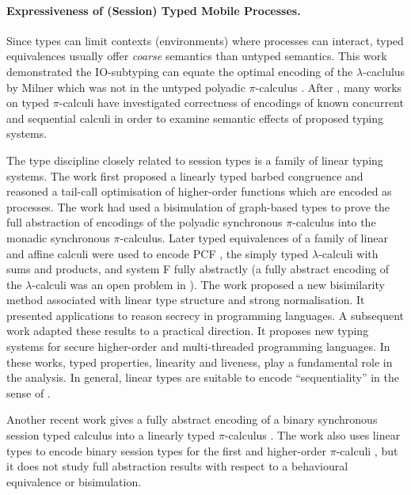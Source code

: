 \paragraph{Expressiveness of (Session) Typed Mobile Processes.}
Since types can limit
contexts (environments) where processes can interact, typed equivalences
usually offer {\em coarse} semantics than untyped semantics. 
This work demonstrated the IO-subtyping can equate 
the optimal encoding of the $\lambda$-caclulus by Milner which was not 
in the untyped polyadic $\pi$-calculus \cite{MilnerR:funp}. 
After \cite{PiSa96b}, many works on typed $\pi$-calculi 
have investigated correctness of encodings of known concurrent and
sequential calculi in order to examine semantic
effects of proposed typing systems. 

The type discipline closely related
to session types is a family of linear typing systems. The
work \cite{LinearPi} first proposed a linearly typed barbed congruence and 
reasoned a tail-call optimisation of higher-order functions which are
encoded 
as processes. 
The work \cite{Yoshida96} had
used a bisimulation of graph-based types to prove the full abstraction
of encodings of the polyadic synchronous $\pi$-calculus into the
monadic synchronous $\pi$-calculus. 
Later typed equivalences of a
family of linear and affine calculi \cite{BHY,YBH04,BergerHY05} 
were used to encode 
PCF \cite{Plotkin1977223,Milner19771}, the simply typed $\lambda$-calculi with sums and products, and system F \cite{GirardJY:protyp}
fully abstractly (a fully abstract encoding of the $\lambda$-calculi 
was an open problem in \cite{MilnerR:funp}).  
The work \cite{YHB02} proposed a new bisimilarity
method associated with linear type structure and strong
normalisation. It presented applications to reason secrecy in
programming languages. A subsequent work \cite{HY02} adapted these results
to a practical direction. It proposes new typing
systems for secure higher-order and multi-threaded programming 
languages. 
In these works, typed properties, linearity and liveness, 
play a fundamental role in the analysis. In general, linear types 
are suitable to encode ``sequentiality'' in the sense of 
\cite{HylandJME:fulapi,AbramskyS:fulap}.

Another recent work \cite{DemangeonH11} gives a fully abstract encoding of a 
binary synchronous
session typed calculus into a linearly typed $\pi$-calculus \cite{BHY}.
The work \cite{Dardha:2012:STR:2370776.2370794} also 
uses linear types to 
encode binary session types for the first and higher-order 
$\pi$-calculi \cite{tlca07}, but it does not 
study full abstraction results with respect to 
a behavioural equivalence or bisimulation.
 


